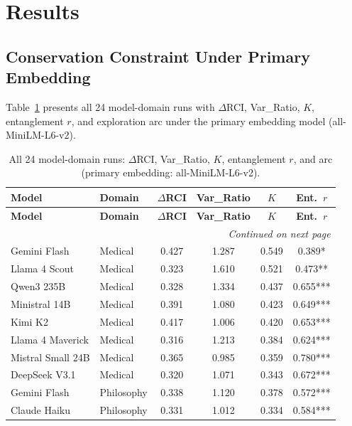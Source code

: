 \documentclass[11pt,a4paper]{article}
\begin{document}
\section{Results}

\subsection{Conservation Constraint Under Primary Embedding}

Table~\ref{tab:all_runs} presents all 24 model-domain runs with $\Delta$RCI, Var\_Ratio,
$K$, entanglement $r$, and exploration arc under the primary embedding model
(all-MiniLM-L6-v2).

\begin{longtable}{llcccc}
\caption{All 24 model-domain runs: $\Delta$RCI, Var\_Ratio, $K$, entanglement $r$, and
arc (primary embedding: all-MiniLM-L6-v2).}
\label{tab:all_runs}\\
\toprule
\textbf{Model} & \textbf{Domain} & \textbf{$\Delta$RCI} & \textbf{Var\_Ratio} &
\textbf{$K$} & \textbf{Ent.\ $r$} \\
\midrule
\endfirsthead
\toprule
\textbf{Model} & \textbf{Domain} & \textbf{$\Delta$RCI} & \textbf{Var\_Ratio} &
\textbf{$K$} & \textbf{Ent.\ $r$} \\
\midrule
\endhead
\midrule
\multicolumn{6}{r}{\textit{Continued on next page}} \\
\endfoot
\bottomrule
\endlastfoot
Gemini Flash         & Medical    & 0.427 & 1.287 & 0.549 & 0.389* \\
Llama 4 Scout        & Medical    & 0.323 & 1.610 & 0.521 & 0.473** \\
Qwen3 235B           & Medical    & 0.328 & 1.334 & 0.437 & 0.655*** \\
Ministral 14B        & Medical    & 0.391 & 1.080 & 0.423 & 0.649*** \\
Kimi K2              & Medical    & 0.417 & 1.006 & 0.420 & 0.653*** \\
Llama 4 Maverick     & Medical    & 0.316 & 1.213 & 0.384 & 0.624*** \\
Mistral Small 24B    & Medical    & 0.365 & 0.985 & 0.359 & 0.780*** \\
DeepSeek V3.1        & Medical    & 0.320 & 1.071 & 0.343 & 0.672*** \\
\midrule
Gemini Flash         & Philosophy & 0.338 & 1.120 & 0.378 & 0.572*** \\
Claude Haiku         & Philosophy & 0.331 & 1.012 & 0.334 & 0.584*** \\

\end{longtable}
\end{document}
